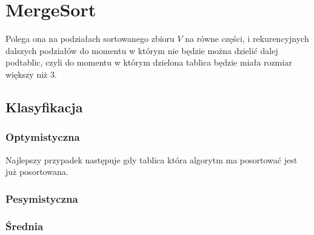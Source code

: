 \section{MergeSort}
Polega ona na podziałach sortowanego zbioru $V$ na równe części, i rekurencyjnych dalszych podziałów  do momentu w którym nie będzie można dzielić dalej podtablic, czyli do momentu w którym dzielona tablica będzie miała rozmiar większy niż 3.
\subsection{Klasyfikacja}
\subsubsection{Optymistyczna}
Najlepszy przypadek następuje gdy tablica która algorytm ma posortować jest już posortowana.
\subsubsection{Pesymistyczna}

\subsubsection{Średnia}

